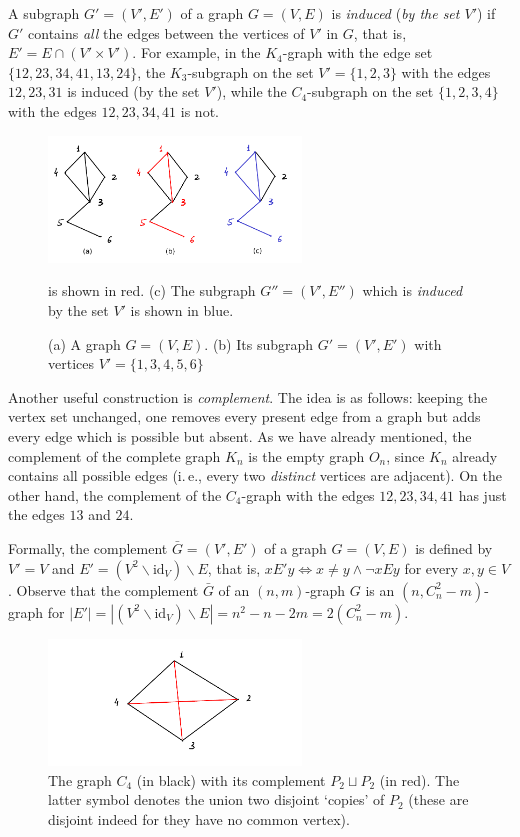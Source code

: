 \documentclass[12pt,notitlepage]{article}
\theoremstyle{plain}
\theoremstyle{definition}
\theoremstyle{plain}
\renewcommand{\setminus}{\smallsetminus}
\newcommand{\id}{\mathrm{id}}
\newcommand{\1}{\mathbf{1}}
\newcommand{\0}{\mathbf{0}}
\begin{document}
A subgraph $G' = (V', E')$ of a graph $G = (V, E)$ is \emph{induced} (\emph{by the set $V'$}) if $G'$ contains \emph{all} the edges between the vertices of $V'$ in $G$, that is, $E' = E \cap (V' \times V')$. For example, in the $K_4$-graph with the edge set $\{12, 23, 34, 41, 13, 24\}$, the $K_3$-subgraph on the set $V' = \{1,2,3\}$ with the edges $12, 23, 31$ is induced (by the set $V'$), while the $C_4$-subgraph on the set $\{1,2,3,4\}$ with the edges $12, 23, 34, 41$ is not.

\begin{figure}[h]
	\centering
	\includegraphics*[width=0.6\textwidth]{graph_sub.pdf}
	\caption{(a) A graph $G = (V, E)$. (b) Its subgraph $G' = (V', E')$ with vertices $V' = \{1, 3, 4, 5, 6\}$} is shown in red. (c) The subgraph $G'' = (V', E'')$ which is \emph{induced} by the set $V'$ is shown in blue.
\end{figure}

Another useful construction is \emph{complement}. The idea is as follows: keeping the vertex set unchanged, one removes every present edge from a graph but adds every edge which is possible but absent. As we have already mentioned, the complement of the complete graph $K_n$ is the empty graph $O_n$, since $K_n$ already contains all possible edges (i.\,e., every two \emph{distinct} vertices are adjacent). On the other hand, the complement of the $C_4$-graph with the edges $12, 23, 34, 41$ has just the edges $13$ and $24$.

Formally, the complement $\bar G = (V', E')$ of a graph $G = (V, E)$ is defined by $V' = V$ and $E' = (V^2 \setminus \id_{V}) \setminus E$, that is, $x E' y \iff x \neq y \wedge \neg x E y$ for every $x, y \in V$. Observe that the complement $\bar G$ of an $(n, m)$-graph $G$ is an $(n, C_n^2 - m)$-graph for $|E'| = |(V^2 \setminus \id_{V}) \setminus E| = n^2 - n - 2m = 2(C_n^2 - m)$.

\begin{figure}[h]
	\centering
	\includegraphics*[width=0.6\textwidth]{graph_compl.pdf}
	\caption{The graph $C_4$ (in black) with its complement $P_2 \sqcup P_2$ (in red). The latter symbol denotes the union two disjoint `copies' of $P_2$ (these are disjoint indeed for they have no common vertex).}
\end{figure}
\end{document}
